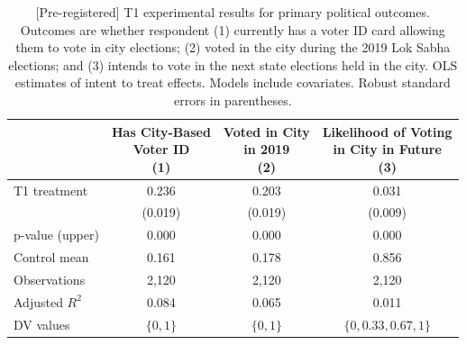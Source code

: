 \documentclass[
  11.5pt,
]{article}
\begin{document}
\clearpage

\clearpage

\begin{table}

\caption{\label{tab:unnamed-chunk-8}[Pre-registered] T1 experimental results for primary political outcomes. Outcomes are whether respondent (1) currently has a voter ID card allowing them to vote in city elections; (2) voted in the city during the 2019 Lok Sabha elections; and (3) intends to vote in the next state elections held in the city. OLS estimates of intent to treat effects. Models include covariates. Robust standard errors in parentheses.}
\centering
\begin{tabular}[t]{lccc}
\toprule
 & \makecell[c]{Has City-Based\\ Voter ID \\(1)} & \makecell[c]{Voted in City\\ in 2019 \\(2)} & \makecell[c]{Likelihood of Voting\\ in City in Future \\(3)}\\
\midrule
T1 treatment & 0.236 & 0.203 & 0.031\\
 & (0.019) & (0.019) & (0.009)\\
\midrule
p-value (upper) & 0.000 & 0.000 & 0.000\\
Control mean & 0.161 & 0.178 & 0.856\\
Observations & 2,120 & 2,120 & 2,120\\
Adjusted $R^2$ & 0.084 & 0.065 & 0.011\\
DV values & $\{0, 1\}$ & $\{0, 1\}$ & $\{0, 0.33, 0.67, 1\}$\\
\bottomrule
\end{tabular}
\end{table}

\clearpage
\end{document}
